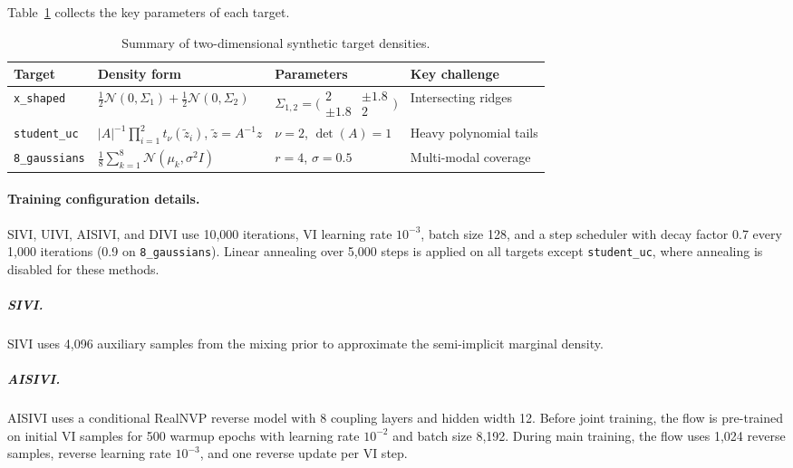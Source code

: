 \bigskip

Table~\ref{tab:toy-target-summary} collects the key parameters of each target.

\begin{table}[h]
\centering
\caption{Summary of two-dimensional synthetic target densities.}
\label{tab:toy-target-summary}
\small
\begin{tabular}{@{}llll@{}}
\toprule
\textbf{Target} & \textbf{Density form} & \textbf{Parameters} & \textbf{Key challenge} \\
\midrule
\texttt{x\_shaped}
  & $\frac{1}{2}\mathcal{N}(0,\Sigma_1) + \frac{1}{2}\mathcal{N}(0,\Sigma_2)$
  & $\Sigma_{1,2} = \bigl(\begin{smallmatrix}2 & \pm1.8\\ \pm1.8 & 2\end{smallmatrix}\bigr)$
  & Intersecting ridges \\[6pt]
\texttt{student\_uc}
  & $|A|^{-1}\prod_{i=1}^{2} t_\nu(\tilde{z}_i)$, \; $\tilde{z}=A^{-1}z$
  & $\nu=2$, \; $\det(A)=1$
  & Heavy polynomial tails \\[6pt]
\texttt{8\_gaussians}
  & $\frac{1}{8}\sum_{k=1}^{8}\mathcal{N}(\mu_k, \sigma^2 I)$
  & $r=4$, \; $\sigma=0.5$
  & Multi-modal coverage \\
\bottomrule
\end{tabular}
\end{table}




\paragraph{Training configuration details.}
SIVI, UIVI, AISIVI, and DIVI use 10,000 iterations, VI learning rate $10^{-3}$, batch size 128, and a step scheduler with decay factor 0.7 every 1,000 iterations (0.9 on \texttt{8\_gaussians}). Linear annealing over 5,000 steps is applied on all targets except \texttt{student\_uc}, where annealing is disabled for these methods.

\subparagraph{SIVI.}
SIVI uses 4,096 auxiliary samples from the mixing prior to approximate the semi-implicit marginal density.

\subparagraph{AISIVI.}
AISIVI uses a conditional RealNVP reverse model with 8 coupling layers and hidden width 12.  Before joint training, the flow is pre-trained on initial VI samples for 500 warmup epochs with learning rate $10^{-2}$ and batch size 8,192.  During main training, the flow uses 1,024 reverse samples, reverse learning rate $10^{-3}$, and one reverse update per VI step.

